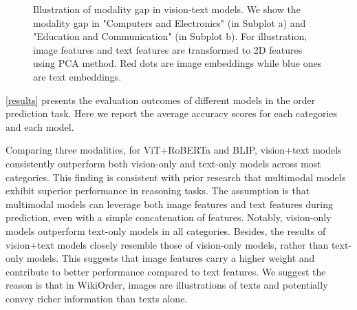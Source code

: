 \documentclass[11pt]{article}
\begin{document}
\begin{figure}[ht]
\centering 
{}\hspace{10mm}
\caption{\label{fig:mg}Illustration of modality gap in vision-text models. We show the modality gap in "Computers and Electronics" (in Subplot a) and "Education and Communication" (in Subplot b). For illustration, image features and text features are transformed to 2D features using PCA method. Red dots are image embeddings while blue ones are text embeddings.}
\end{figure}



\autoref{results} presents the evaluation outcomes of different models in the order prediction task. Here we report the average accuracy scores for each categories and each model.

Comparing three modalities, for ViT+RoBERTa and BLIP, vision+text models consistently outperform both vision-only and text-only models across most categories. This finding is consistent with prior research that multimodal models exhibit superior performance in reasoning tasks. The assumption is that multimodal models can leverage both image features and text features during prediction, even with a simple concatenation of features. Notably, vision-only models outperform text-only models in all categories. Besides, the results of vision+text models closely resemble those of vision-only models, rather than text-only models. This suggests that image features carry a higher weight and contribute to better performance compared to text features. We suggest the reason is that in WikiOrder, images are illustrations of texts and potentially convey richer information than texts alone.
\end{document}
